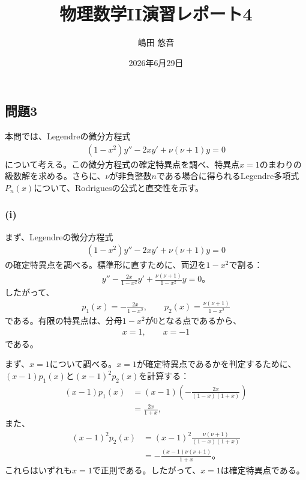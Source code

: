\documentclass[platex,dvipdfmx,a4paper]{jsarticle}
\title{物理数学II演習レポート4}
\author{嶋田 悠音}
\date{2026年6月29日}
\begin{document}
  \maketitle
  \subsection*{問題3}

  本問では、Legendreの微分方程式
  \begin{align*}
    (1-x^2)y''-2xy'+\nu(\nu+1)y=0
  \end{align*}
  について考える。この微分方程式の確定特異点を調べ、特異点$x=1$のまわりの級数解を求める。さらに、$\nu$が非負整数$n$である場合に得られるLegendre多項式$P_n(x)$について、Rodriguesの公式と直交性を示す。

  \subsubsection*{(i)}
  まず、Legendreの微分方程式
  \begin{align*}
    (1-x^2)y''-2xy'+\nu(\nu+1)y=0
  \end{align*}
  の確定特異点を調べる。標準形に直すために、両辺を$1-x^2$で割る：
  \begin{align*}
    y''-\frac{2x}{1-x^2}y'
    +\frac{\nu(\nu+1)}{1-x^2}y=0。
  \end{align*}
  したがって、
  \begin{align*}
    p_1(x)=-\frac{2x}{1-x^2},\qquad
    p_2(x)=\frac{\nu(\nu+1)}{1-x^2}
  \end{align*}
  である。有限の特異点は、分母$1-x^2$が$0$となる点であるから、
  \begin{align*}
    x=1,\qquad x=-1
  \end{align*}
  である。
  
  まず、$x=1$について調べる。$x=1$が確定特異点であるかを判定するために、$(x-1)p_1(x)$と$(x-1)^2p_2(x)$を計算する：
  \begin{align*}
    (x-1)p_1(x)
    &=(x-1)\left(-\frac{2x}{(1-x)(1+x)}\right) \\
    &=\frac{2x}{1+x},
  \end{align*}
  また、
  \begin{align*}
    (x-1)^2p_2(x)
    &=(x-1)^2\frac{\nu(\nu+1)}{(1-x)(1+x)} \\
    &=-\frac{(x-1)\nu(\nu+1)}{1+x}。
  \end{align*}
  これらはいずれも$x=1$で正則である。したがって、$x=1$は確定特異点である。
  
\end{document}
